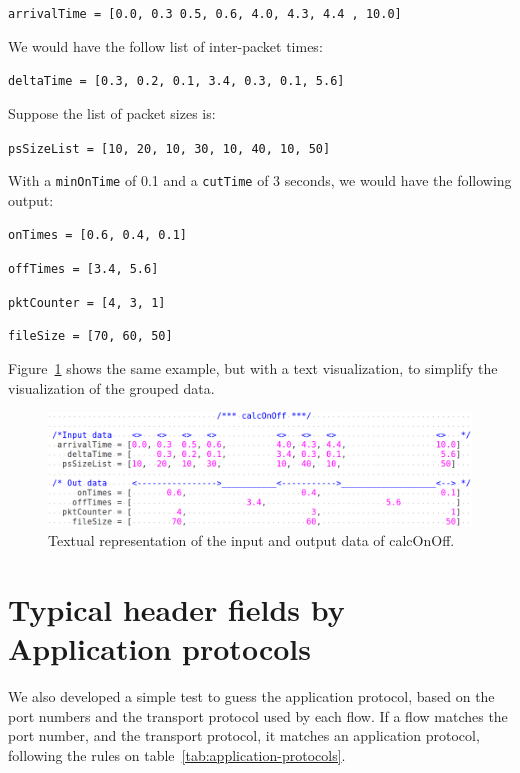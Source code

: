\texttt{arrivalTime  = [0.0, 0.3  0.5, 0.6, 4.0, 4.3, 4.4 , 10.0] }

We would have the follow list of inter-packet times: 

\texttt{deltaTime = [0.3, 0.2, 0.1, 3.4,  0.3, 0.1, 5.6]}

Suppose the list of packet sizes is:

\texttt{psSizeList = [10, 20, 10, 30, 10, 40, 10, 50]}


With a \texttt{minOnTime} of 0.1 and a \texttt{cutTime} of 3 seconds, we would have the following output:

\texttt{onTimes = [0.6, 0.4, 0.1]}

\texttt{offTimes  = [3.4, 5.6]}

\texttt{pktCounter  = [4, 3, 1]}

\texttt{fileSize  = [70, 60, 50]}

Figure~\ref{fig:on-off} shows the same example, but with a text visualization, to simplify the visualization of the grouped data.

\begin{figure}
    \centering
    \includegraphics[width=\linewidth]{figures/ch4/on-off}
    \caption{Textual representation of the input and output data of calcOnOff.}
    \label{fig:on-off}
\end{figure}


\section{Typical header fields by Application protocols}


We also developed a simple test to guess the application protocol, based on the port numbers and the transport protocol used by each flow. If a flow matches the port number, and the transport protocol, it matches an application protocol, following the rules on table~\ref{tab:application-protocols}. 


